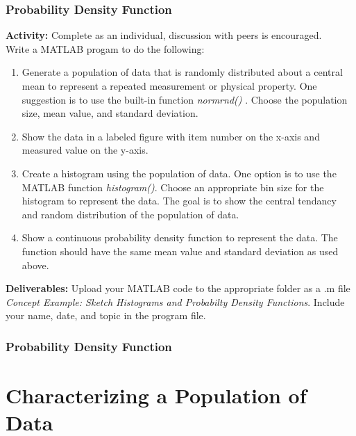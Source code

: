\documentclass[fleqn]{beamer} %
\newcommand{\sectionIItitle}{Characterizing a Population of Data}
\newcommand{\sectionIsubsectionIVtitle}{Probability Density Function}
\begin{document}
			\begin{frame} \scriptsize
				\frametitle{\sectionIsubsectionIVtitle}

				\bigskip
\textbf{Activity:} Complete as an individual, discussion with peers is encouraged.\\
      Write a MATLAB progam to do the following:
			\begin{enumerate}
		    \item Generate a population of data that is randomly distributed about a central mean to represent a repeated measurement or physical property. One suggestion is to use the built-in function {\it normrnd() }. Choose the population size, mean value, and standard deviation.
        \item Show the data in a labeled figure with item number on the x-axis and measured value on the y-axis.  
				\item Create a histogram using the population of data. One option is to use the MATLAB function {\it histogram()}. Choose an appropriate bin size for the histogram to represent the data. The goal is to show the central tendancy and random distribution of the population of data.
		    \item Show a continuous probability density function to represent the data. The function should have the same mean value and standard deviation as used above.
      	\end{enumerate}

		\textbf{Deliverables:} Upload your MATLAB code to the appropriate folder as a .m file {\it Concept Example: Sketch Histograms and Probabilty Density Functions}. Include your name, date, and topic in the program file.	

				
			\end{frame}

			\begin{frame}
				\frametitle{\sectionIsubsectionIVtitle}

\bigskip


			\end{frame}

	
	\section{\sectionIItitle}\label{sectionII}
\end{document}
